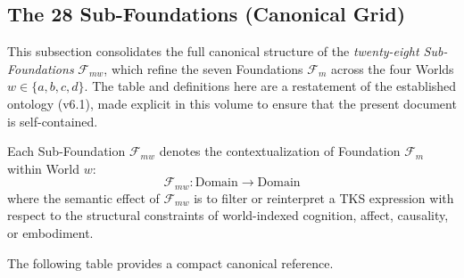 \documentclass[11pt,twoside,openright]{book}
\theoremstyle{definition}
\theoremstyle{plain}
\theoremstyle{remark}
\newcommand{\Foundations}{\mathcal{F}}
\begin{document}
\subsection{The 28 Sub-Foundations (Canonical Grid)}
\label{sec:28-subfoundations}

This subsection consolidates the full canonical structure of the
\emph{twenty-eight Sub-Foundations} $\Foundations_{mw}$, which refine the seven
Foundations $\Foundations_m$ across the four Worlds $w \in \{a,b,c,d\}$. The table and
definitions here are a restatement of the established ontology (v6.1), made
explicit in this volume to ensure that the present document is
self-contained.

Each Sub-Foundation $\Foundations_{mw}$ denotes the contextualization of Foundation
$\Foundations_m$ within World $w$:
\[
\Foundations_{mw} : \mathrm{Domain} \to \mathrm{Domain}
\]
where the semantic effect of $\Foundations_{mw}$ is to filter or reinterpret a TKS
expression with respect to the structural constraints of world-indexed
cognition, affect, causality, or embodiment.

The following table provides a compact canonical reference.
\end{document}
